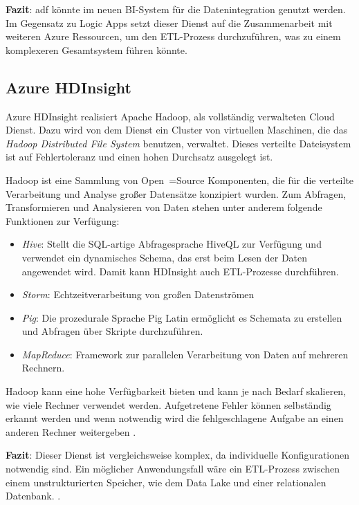 \textbf{Fazit}: \ac{adf} könnte im neuen BI-System für die Datenintegration genutzt werden. Im Gegensatz zu Logic Apps setzt dieser Dienst auf die Zusammenarbeit mit weiteren Azure Ressourcen, um den ETL-Prozess durchzuführen, was zu einem komplexeren Gesamtsystem führen könnte.

\subsection{Azure HDInsight} \label{sec:grundlagen:azure_dienste:hdInsight}
Azure HDInsight realisiert Apache Hadoop, als vollständig verwalteten Cloud Dienst. Dazu wird von dem Dienst ein Cluster von virtuellen Maschinen, die das \textit{Hadoop Distributed File System} benutzen, verwaltet. Dieses verteilte Dateisystem ist auf Fehlertoleranz und einen hohen Durchsatz ausgelegt ist.

Hadoop ist eine Sammlung von Open~=Source Komponenten, die für die verteilte Verarbeitung und Analyse großer Datensätze konzipiert wurden. Zum Abfragen, Transformieren und Analysieren von Daten stehen unter anderem folgende Funktionen zur Verfügung:
\begin{itemize}
\item \textit{Hive}: Stellt die SQL-artige Abfragesprache HiveQL zur Verfügung und verwendet ein dynamisches Schema, das erst beim Lesen der Daten angewendet wird. Damit kann HDInsight auch ETL-Prozesse durchführen.
\item \textit{Storm}: Echtzeitverarbeitung von großen Datenströmen 
\item \textit{Pig}: Die prozedurale Sprache Pig Latin ermöglicht es Schemata zu erstellen und Abfragen über Skripte durchzuführen.
\item \textit{MapReduce}: Framework zur parallelen Verarbeitung von Daten auf mehreren Rechnern.
\end{itemize}

Hadoop kann eine hohe Verfügbarkeit bieten und kann je nach Bedarf skalieren, wie viele Rechner verwendet werden. Aufgetretene Fehler können selbständig erkannt werden und wenn notwendig wird die fehlgeschlagene Aufgabe an einen anderen Rechner weitergeben \cite{klein_iot_2017}.

\textbf{Fazit}: Dieser Dienst ist vergleichsweise komplex, da individuelle Konfigurationen notwendig sind. Ein möglicher Anwendungsfall wäre ein ETL-Prozess zwischen einem unstrukturierten Speicher, wie dem Data Lake und einer relationalen Datenbank. \cite[vgl.][]{klein_iot_2017}.

